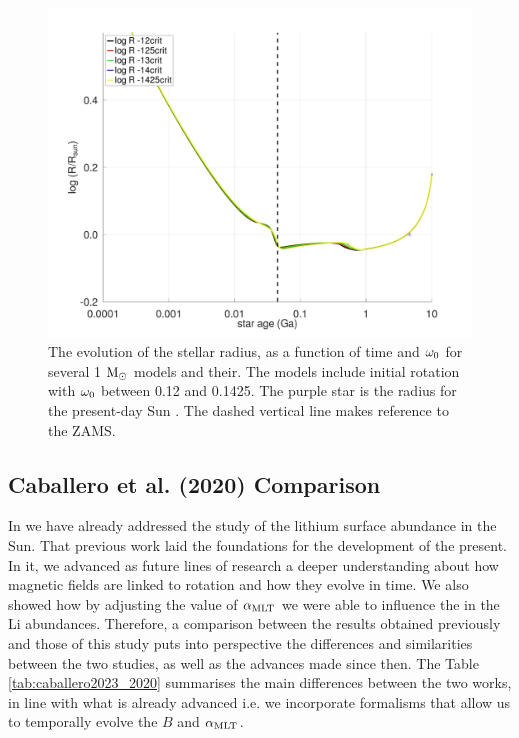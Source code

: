 \documentclass[fleqn,usenatbib]{mnras}
\begin{document}
\begin{figure}
	\includegraphics[clip,width=\columnwidth]{figures/paper2/lograd_var_vel_g3.pdf}
    \caption{The evolution of the stellar radius, as a function of time and $\omega_{\mathrm{0}}$ for several 1 $\mathrm{M}_\odot$ models and their. The models include initial rotation with $\omega_{\mathrm{0}}$ between 0.12 and 0.1425. The purple star is the radius for the present-day Sun \citep{Gill2012}. The dashed vertical line makes reference to the ZAMS.}
    \label{fig:lograd_var_vel_g3}
\end{figure}

\subsection{Caballero et al. (2020) Comparison}
In \citet{Caballero2020} we have already addressed the study of the lithium surface abundance in the Sun. That previous work laid the foundations for the development of the present. In it, we advanced as future lines of research a deeper understanding about how magnetic fields are linked to rotation and how they evolve in time. We also showed how by adjusting the value of $\alpha_{\mathrm{MLT}}$ we were able to influence the in the Li abundances. Therefore, a comparison between the results obtained previously and those of this study puts into perspective the differences and similarities between the two studies, as well as the advances made since then. The Table \ref{tab:caballero2023_2020} summarises the main differences between the two works, in line with what is already advanced i.e. we incorporate formalisms that allow us to temporally evolve the $B$ and $\alpha_{\mathrm{MLT}}$.\par 
\end{document}
